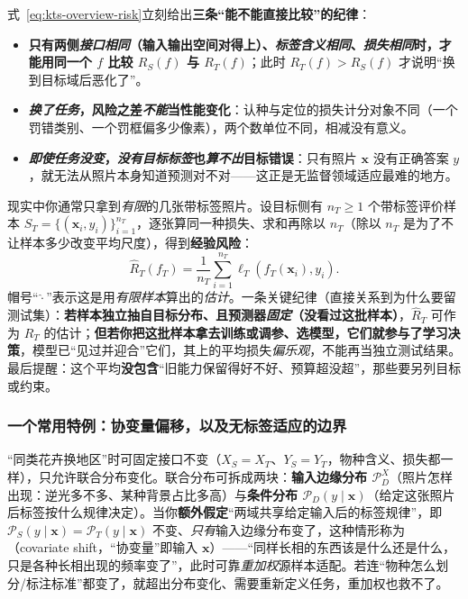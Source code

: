 式~\eqref{eq:kts-overview-risk}立刻给出\textbf{三条“能不能直接比较”的纪律}：
\begin{itemize}\item \textbf{只有两侧\emph{接口相同}（输入输出空间对得上）、\emph{标签含义相同}、\emph{损失相同}时，才能用同一个 $f$ 比较 $R_S(f)$ 与 $R_T(f)$}；此时 $R_T(f)>R_S(f)$ 才说明“换到目标域后恶化了”。\item \textbf{\emph{换了任务}，风险之差\emph{不能}当性能变化}：认种与定位的损失计分对象不同（一个罚错类别、一个罚框偏多少像素），两个数单位不同，相减没有意义。\item \textbf{\emph{即使任务没变}，\emph{没有目标标签}也\emph{算不出}目标错误}：只有照片 $\bm{x}$ 没有正确答案 $y$，就无法从照片本身知道预测对不对——这正是无监督领域适应最难的地方。\end{itemize}

现实中你通常只拿到\emph{有限}的几张带标签照片。设目标侧有 $n_T\ge 1$ 个带标签评价样本 $S_T=\{(\bm{x}_i,y_i)\}_{i=1}^{n_T}$，逐张算同一种损失、求和再除以 $n_T$（除以 $n_T$ 是为了不让样本多少改变平均尺度），得到\textbf{经验风险}：
\begin{equation}
  \hat R_T(f_T)=\frac{1}{n_T}
  \sum_{i=1}^{n_T}\ell_T(f_T(\bm{x}_i),y_i).
  \label{eq:kts-overview-empirical-risk}
\end{equation}
帽号“$\hat{\cdot}$”表示这是用\emph{有限样本}算出的\emph{估计}。一条关键纪律（直接关系到为什么要留测试集）：\textbf{若样本独立抽自目标分布、且预测器\emph{固定}（没看过这批样本）}，$\hat R_T$ 可作为 $R_T$ 的估计；\textbf{但若你把这批样本拿去训练或调参、选模型，它们就参与了学习决策}，模型已“见过并迎合”它们，其上的平均损失\emph{偏乐观}，不能再当独立测试结果。最后提醒：这个平均\textbf{没包含}“旧能力保留得好不好、预算超没超”，那些要另列目标或约束。

\subsubsection{一个常用特例：协变量偏移，以及无标签适应的边界}

“同类花卉换地区”时可固定接口不变（$X_S=X_T$、$Y_S=Y_T$，物种含义、损失都一样），只允许联合分布变化。联合分布可拆成两块：\textbf{输入边缘分布 $\mathcal P_D^X$}（照片怎样出现：逆光多不多、某种背景占比多高）与\textbf{条件分布 $\mathcal P_D(y\mid\bm{x})$}（给定这张照片后标签按什么规律决定）。当你\textbf{额外假定}“两域共享给定输入后的标签规律”，即 $\mathcal P_S(y\mid\bm{x})=\mathcal P_T(y\mid\bm{x})$ 不变、\emph{只有}输入边缘分布变了，这种情形称为（covariate shift，“协变量”即输入 $\bm{x}$）——“同样长相的东西该是什么还是什么，只是各种长相出现的频率变了”，此时可靠\emph{重加权}源样本适配。若连“物种怎么划分/标注标准”都变了，就超出分布变化、需要重新定义任务，重加权也救不了。

